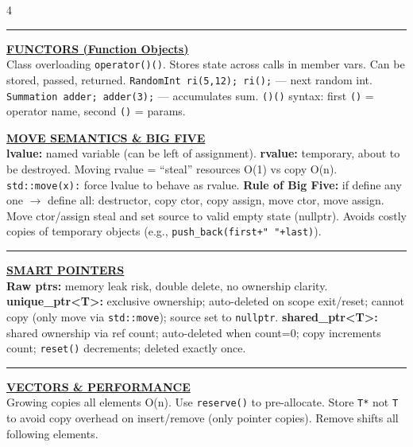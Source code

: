 \documentclass[landscape,letterpaper]{article}
\newcommand{\h}[1]{\textbf{#1}}
\newcommand{\hd}[1]{\vspace{1pt}\noindent\textbf{\underline{#1}}\vspace{-1pt}}
\begin{document}
\begin{multicols}{4}
\vspace{-1pt}\noindent\rule{\columnwidth}{0.2pt}\vspace{-3pt}

\hd{FUNCTORS (Function Objects)}\\[-2pt]
Class overloading \texttt{operator()()}. Stores state across calls in member vars. Can be stored, passed, returned. \texttt{RandomInt ri(5,12); ri();} — next random int. \texttt{Summation adder; adder(3);} — accumulates sum. \texttt{()(){}} syntax: first \texttt{()} = operator name, second \texttt{()} = params.\\[-2pt]

\columnbreak

\hd{MOVE SEMANTICS \& BIG FIVE}\\[-2pt]
\h{lvalue:} named variable (can be left of assignment). \h{rvalue:} temporary, about to be destroyed. Moving rvalue = ``steal'' resources O(1) vs copy O(n). \texttt{std::move(x):} force lvalue to behave as rvalue. \h{Rule of Big Five:} if define any one $\to$ define all: destructor, copy ctor, copy assign, move ctor, move assign. Move ctor/assign steal and set source to valid empty state (nullptr). Avoids costly copies of temporary objects (e.g., \texttt{push\_back(first+" "+last)}).\\[-2pt]

\vspace{-1pt}\noindent\rule{\columnwidth}{0.2pt}\vspace{-3pt}

\hd{SMART POINTERS}\\[-2pt]
\h{Raw ptrs:} memory leak risk, double delete, no ownership clarity. \h{unique\_ptr\textless T\textgreater:} exclusive ownership; auto-deleted on scope exit/reset; cannot copy (only move via \texttt{std::move}); source set to \texttt{nullptr}. \h{shared\_ptr\textless T\textgreater:} shared ownership via ref count; auto-deleted when count=0; copy increments count; \texttt{reset()} decrements; deleted exactly once.\\[-2pt]

\vspace{-1pt}\noindent\rule{\columnwidth}{0.2pt}\vspace{-3pt}

\hd{VECTORS \& PERFORMANCE}\\[-2pt]
Growing copies all elements O(n). Use \texttt{reserve()} to pre-allocate. Store \texttt{T*} not \texttt{T} to avoid copy overhead on insert/remove (only pointer copies). Remove shifts all following elements.\\[-2pt]


\end{multicols}
\end{document}

